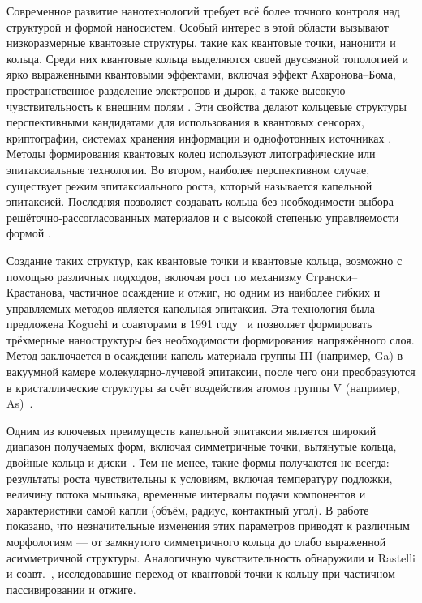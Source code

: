 \documentclass[14pt,oneside]{extarticle}
\begin{document}


\tableofcontents
\pagebreak


Современное развитие нанотехнологий требует всё более точного контроля над структурой и формой наносистем. Особый интерес в этой области вызывают низкоразмерные квантовые структуры, такие как квантовые точки, нанонити и кольца. Среди них квантовые кольца выделяются своей двусвязной топологией и ярко выраженными квантовыми эффектами, включая эффект Ахаронова–Бома, пространственное разделение электронов и дырок, а также высокую чувствительность к внешним полям \cite{Li2009, Beo2020}. Эти свойства делают кольцевые структуры перспективными кандидатами для использования в квантовых сенсорах, криптографии, системах хранения информации и однофотонных источниках \cite{Gurioli2001, SinglePhotonReview2019}. Методы формирования квантовых колец используют литографические или эпитаксиальные технологии. Во втором, наиболее перспективном случае, существует режим эпитаксиального роста, который называется капельной эпитаксией. Последняя позволяет создавать кольца без необходимости выбора решёточно-рассогласованных материалов и с высокой степенью управляемости формой \cite{Korytov2012, Nemcsics2011}.

Создание таких структур, как квантовые точки и квантовые кольца, возможно с помощью различных подходов, включая рост по механизму Странски–Крастанова, частичное осаждение и отжиг, но одним из наиболее гибких и управляемых методов является капельная эпитаксия. Эта технология была предложена Koguchi и соавторами в 1991 году~\cite{koguchi1991} и позволяет формировать трёхмерные наноструктуры без необходимости формирования напряжённого слоя. Метод заключается в осаждении капель материала группы III (например, Ga) в вакуумной камере молекулярно-лучевой эпитаксии, после чего они преобразуются в кристаллические структуры за счёт воздействия атомов группы V (например, As)~\cite{Korytov2012, Nemcsics2011}.

Одним из ключевых преимуществ капельной эпитаксии является широкий диапазон получаемых форм, включая симметричные точки, вытянутые кольца, двойные кольца и диски~\cite{Somaschini2011, Koguchi1991}. Тем не менее, такие формы получаются не всегда: результаты роста чувствительны к условиям, включая температуру подложки, величину потока мышьяка, временные интервалы подачи компонентов и характеристики самой капли (объём, радиус, контактный угол). В работе~\cite{zhou2013} показано, что незначительные изменения этих параметров приводят к различным морфологиям — от замкнутого симметричного кольца до слабо выраженной асимметричной структуры. Аналогичную чувствительность обнаружили и Rastelli и соавт.~\cite{rastelli2004}, исследовавшие переход от квантовой точки к кольцу при частичном пассивировании и отжиге.
\end{document}
